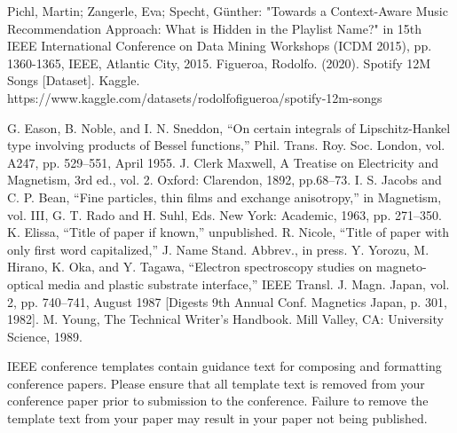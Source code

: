 \documentclass[conference]{IEEEtran}
\begin{document}
\begin{thebibliography}{00}
 Pichl, Martin; Zangerle, Eva; Specht, Günther: "Towards a Context-Aware Music Recommendation Approach: What is Hidden in the Playlist Name?" in 15th IEEE International Conference on Data Mining Workshops (ICDM 2015), pp. 1360-1365, IEEE, Atlantic City, 2015.
 Figueroa, Rodolfo. (2020). Spotify 12M Songs [Dataset]. Kaggle. https://www.kaggle.com/datasets/rodolfofigueroa/spotify-12m-songs

 G. Eason, B. Noble, and I. N. Sneddon, ``On certain integrals of Lipschitz-Hankel type involving products of Bessel functions,'' Phil. Trans. Roy. Soc. London, vol. A247, pp. 529--551, April 1955.
 J. Clerk Maxwell, A Treatise on Electricity and Magnetism, 3rd ed., vol. 2. Oxford: Clarendon, 1892, pp.68--73.
 I. S. Jacobs and C. P. Bean, ``Fine particles, thin films and exchange anisotropy,'' in Magnetism, vol. III, G. T. Rado and H. Suhl, Eds. New York: Academic, 1963, pp. 271--350.
 K. Elissa, ``Title of paper if known,'' unpublished.
 R. Nicole, ``Title of paper with only first word capitalized,'' J. Name Stand. Abbrev., in press.
 Y. Yorozu, M. Hirano, K. Oka, and Y. Tagawa, ``Electron spectroscopy studies on magneto-optical media and plastic substrate interface,'' IEEE Transl. J. Magn. Japan, vol. 2, pp. 740--741, August 1987 [Digests 9th Annual Conf. Magnetics Japan, p. 301, 1982].
 M. Young, The Technical Writer's Handbook. Mill Valley, CA: University Science, 1989.
\end{thebibliography}
\vspace{12pt}
\color{red}
IEEE conference templates contain guidance text for composing and formatting conference papers. Please ensure that all template text is removed from your conference paper prior to submission to the conference. Failure to remove the template text from your paper may result in your paper not being published.
\end{document}
